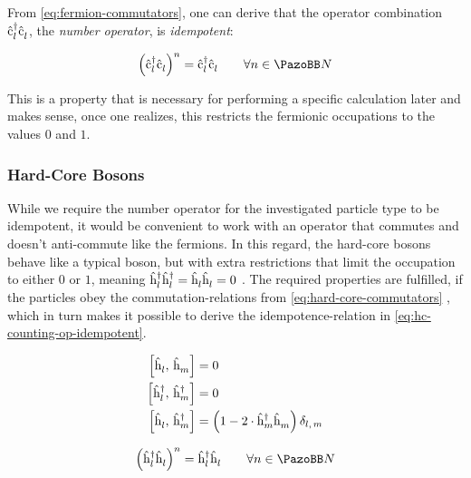 From \autoref{eq:fermion-commutators}, one can derive that the operator combination $\hat{\text{c}}^{\dagger }_{l}\hat{\text{c}}^{ }_{l}$, the \emph{number operator}, is \emph{idempotent}: 

\begin{equation}
    \label{eq:fermion-counting-op-idempotent}
    \left(\cop{l}{\dagger}\cop{l}{}\right)^n = 
    \cop{l}{\dagger}\cop{l}{} \qquad \forall n \in \mathbb{N}
\end{equation}

This is a property that is necessary for performing a specific calculation later and makes sense, once one realizes, this restricts the  fermionic occupations to the values $0$ and $1$.

\subsubsection*{Hard-Core Bosons}

While we require the number operator for the investigated particle type to be idempotent, it would be convenient to work with an operator that commutes and doesn't anti-commute like the fermions. 
In this regard, the hard-core bosons behave like a typical boson, but with extra restrictions that limit the occupation to either $0$ or $1$, meaning $\hat{\text{h}}^{\dagger }_{l}\hat{\text{h}}^{\dagger }_{l} = \hat{\text{h}}^{ }_{l}\hat{\text{h}}^{ }_{l} = 0$ \cite{hardCoreBosonsBasics}.
The required properties are fulfilled, if the particles obey the commutation-relations from \autoref{eq:hard-core-commutators} \cite{hardCoreBosonsFullCommutationRelation}, which in turn makes it possible to derive the idempotence-relation in \autoref{eq:hc-counting-op-idempotent}.

\begin{equation}
    \label{eq:hard-core-commutators}
    \begin{split}
        \left[\hat{\text{h}}^{ }_{l},\,\hat{\text{h}}^{ }_{m}\right] &= 0\\
        \left[\hat{\text{h}}^{\dagger }_{l},\,\hat{\text{h}}^{\dagger }_{m}\right] &= 0\\
        \left[\hat{\text{h}}^{ }_{l},\,\hat{\text{h}}^{\dagger }_{m}\right] &= \left(1 - 2 \cdot \hat{\text{h}}^{\dagger }_{m}\hat{\text{h}}^{ }_{m} \right)\delta_{l,\,m}
    \end{split}
\end{equation}

\begin{equation}
    \label{eq:hc-counting-op-idempotent}
    \left(\hop{l}{\dagger}\hop{l}{}\right)^n = 
    \hop{l}{\dagger}\hop{l}{} \qquad \forall n \in \mathbb{N}
\end{equation}

